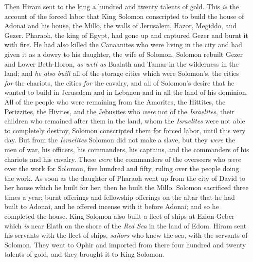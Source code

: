 \begin{biblechapter}
\verse Then Hiram sent to the king a hundred and twenty talents of gold.
 This \textit{is} the account of the forced labor that King Solomon conscripted to build the house of Adonai and his house, the Millo, the walls of Jerusalem, Hazor, Megiddo, and Gezer.
\verse Pharaoh, the king of Egypt, had gone up and captured Gezer and burnt it with fire. He had also killed the Canaanites who were living in the city and had given it as a dowry to his daughter, the wife of Solomon.
\verse Solomon rebuilt Gezer and Lower Beth-Horon,
\verse \textit{as well as} Baalath and Tamar in the wilderness in the land;
\verse and \textit{he also built} all of the storage cities which were Solomon’s, the cities \textit{for} the chariots, the cities \textit{for} the cavalry, and all of Solomon’s desire that he wanted to build in Jerusalem and in Lebanon and in all the land of his dominion.
\verse All of the people who were remaining from the Amorites, the Hittites, the Perizzites, the Hivites, and the Jebusites who \textit{were} not of the \textit{Israelites},
\verse their children who remained after them in the land, whom the \textit{Israelites} were not able to completely destroy, Solomon conscripted them for forced labor, until this very day.
\verse But from the \textit{Israelites} Solomon did not make a slave, but they \textit{were} the men of war, his officers, his commanders, his captains, and the commanders of his chariots and his cavalry.
\verse These \textit{were} the commanders of the overseers who \textit{were} over the work for Solomon, five hundred and fifty, ruling over the people doing the work.
\verse As soon as the daughter of Pharaoh went up from the city of David to her house which he built for her, then he built the Millo.
\verse Solomon sacrificed three times a year: burnt offerings and fellowship offerings on the altar that he had built to Adonai, and he offered incense with it before Adonai; and so he completed the house.
\verse King Solomon also built a fleet of ships at Ezion-Geber which \textit{is} near Elath on the shore of the \textit{Red Sea} in the land of Edom.
\verse Hiram sent his servants with the fleet of ships, \textit{sailors} who knew the sea, with the servants of Solomon.
\verse They went to Ophir and imported from there four hundred and twenty talents of gold, and they brought it to King Solomon.
\end{biblechapter}

